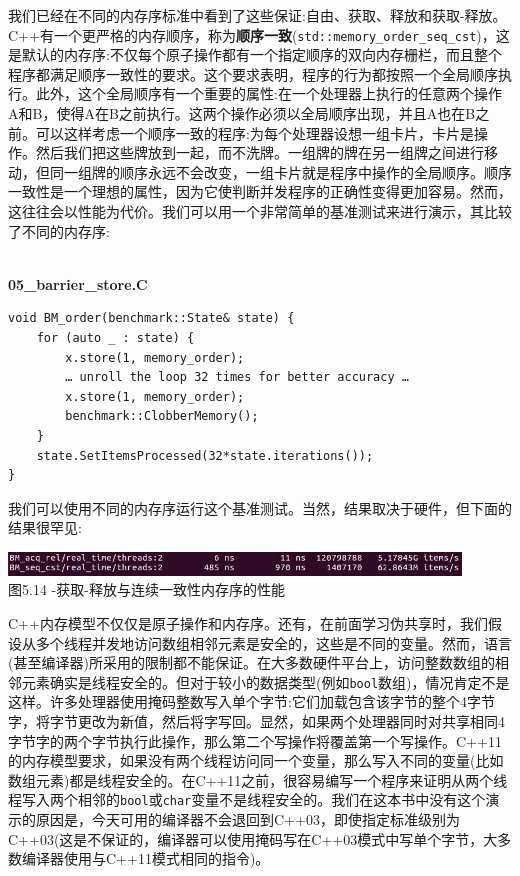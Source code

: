 我们已经在不同的内存序标准中看到了这些保证:自由、获取、释放和获取-释放。C++有一个更严格的内存顺序，称为\textbf{顺序一致}(\texttt{std::memory\_order\_seq\_cst})，这是默认的内存序:不仅每个原子操作都有一个指定顺序的双向内存栅栏，而且整个程序都满足顺序一致性的要求。这个要求表明，程序的行为都按照一个全局顺序执行。此外，这个全局顺序有一个重要的属性:在一个处理器上执行的任意两个操作A和B，使得A在B之前执行。这两个操作必须以全局顺序出现，并且A也在B之前。可以这样考虑一个顺序一致的程序:为每个处理器设想一组卡片，卡片是操作。然后我们把这些牌放到一起，而不洗牌。一组牌的牌在另一组牌之间进行移动，但同一组牌的顺序永远不会改变，一组卡片就是程序中操作的全局顺序。顺序一致性是一个理想的属性，因为它使判断并发程序的正确性变得更加容易。然而，这往往会以性能为代价。我们可以用一个非常简单的基准测试来进行演示，其比较了不同的内存序:

\hspace*{\fill} \\ %
\noindent
\textbf{05\_barrier\_store.C}
\begin{lstlisting}[style=styleCXX]
void BM_order(benchmark::State& state) {
	for (auto _ : state) {
		x.store(1, memory_order);
		… unroll the loop 32 times for better accuracy …
		x.store(1, memory_order);
		benchmark::ClobberMemory();
	}
	state.SetItemsProcessed(32*state.iterations());
}
\end{lstlisting}

我们可以使用不同的内存序运行这个基准测试。当然，结果取决于硬件，但下面的结果很罕见:

\begin{center}
\includegraphics[width=0.9\textwidth]{content/1/chapter5/images/14.jpg}\\
图5.14 -获取-释放与连续一致性内存序的性能
\end{center}

C++内存模型不仅仅是原子操作和内存序。还有，在前面学习伪共享时，我们假设从多个线程并发地访问数组相邻元素是安全的，这些是不同的变量。然而，语言(甚至编译器)所采用的限制都不能保证。在大多数硬件平台上，访问整数数组的相邻元素确实是线程安全的。但对于较小的数据类型(例如\texttt{bool}数组)，情况肯定不是这样。许多处理器使用掩码整数写入单个字节:它们加载包含该字节的整个4字节字，将字节更改为新值，然后将字写回。显然，如果两个处理器同时对共享相同4字节字的两个字节执行此操作，那么第二个写操作将覆盖第一个写操作。C++11的内存模型要求，如果没有两个线程访问同一个变量，那么写入不同的变量(比如数组元素)都是线程安全的。在C++11之前，很容易编写一个程序来证明从两个线程写入两个相邻的\texttt{bool}或\texttt{char}变量不是线程安全的。我们在这本书中没有这个演示的原因是，今天可用的编译器不会退回到C++03，即使指定标准级别为C++03(这是不保证的，编译器可以使用掩码写在C++03模式中写单个字节，大多数编译器使用与C++11模式相同的指令)。

